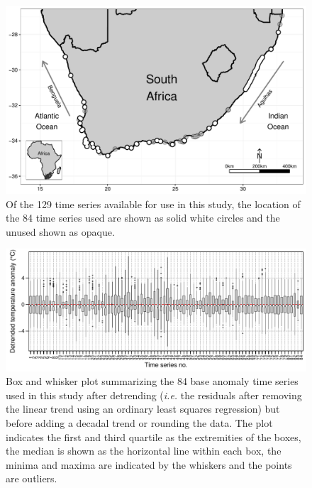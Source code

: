 \documentclass[]{ametsoc}
\begin{document}
%
\begin{figure}
\centering \includegraphics[width=1.0\textwidth]{figure01}
\caption[\small Of the 129 time series available for use in this study]{Of the 129 time series available for use in this study, the location of the 84 time series used are shown as solid white circles and the unused shown as opaque.}
\label{figure01}
\end{figure}

\begin{figure}
\centering \includegraphics[width=1.0\textwidth]{figure02}
\caption[\small Box and whisker plots summarizing the anomaly time series of the base 84 data sets]{Box and whisker plot summarizing the 84 base anomaly time series used in this study after detrending (\emph{i.e.} the residuals after removing the linear trend using an ordinary least squares regression) but before adding a decadal trend or rounding the data. The plot indicates the first and third quartile as the extremities of the boxes, the median is shown as the horizontal line within each box, the minima and maxima are indicated by the whiskers and the points are outliers.}
\label{figure02}
\end{figure}
\end{document}
